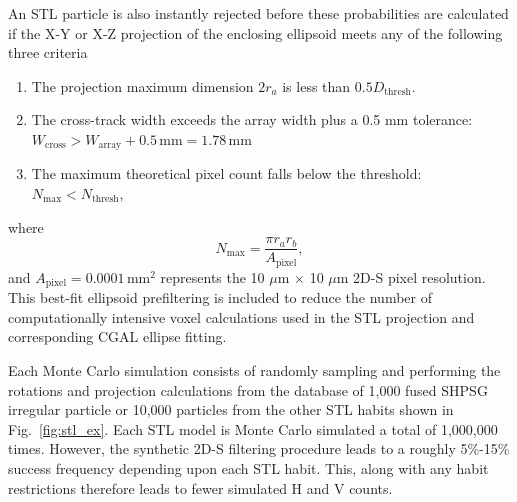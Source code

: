 \documentclass[amt, manuscript]{copernicus}
\begin{document}
An STL particle is also instantly rejected before these probabilities are calculated if the X-Y or X-Z projection of the enclosing ellipsoid meets any of the following three criteria
\begin{enumerate}
\item The projection maximum dimension $2 r_{a}$ is less than $0.5D_{\mathrm{thresh}}$.
\item The cross-track width exceeds the array width plus a 0.5 mm tolerance: $W_{\mathrm{cross}} >W_{\mathrm{array}}+0.5\, \mathrm{mm} = 1.78\, \mathrm{mm}$
\item The maximum theoretical pixel count falls below the threshold: $N_{\mathrm{max}} < N_{\mathrm{thresh}}$,
\end{enumerate} 
where 
\begin{equation}\label{eq:N_max}
N_{\max} = \frac{\pi r_{a} r_{b}}{A_{\mathrm{pixel}}},
\end{equation}
and $A_{\mathrm{pixel}}= 0.0001\, \mathrm{mm}^{2}$ represents the 10 $\mu$m $\times$ 10 $\mu$m 2D-S pixel resolution. This best-fit ellipsoid prefiltering is included to reduce the number of computationally intensive voxel calculations used in the STL projection and corresponding CGAL ellipse fitting.

Each Monte Carlo simulation consists of randomly sampling and performing the rotations and projection calculations from the database of 1,000 fused SHPSG irregular particle or 10,000 particles from the other STL habits shown in Fig.~\ref{fig:stl_ex}. Each STL model is Monte Carlo simulated a total of 1,000,000 times. However, the synthetic 2D-S filtering procedure leads to a roughly 5\%-15\% success frequency depending upon each STL habit. This, along with any \citet{Schima2024} habit restrictions therefore leads to fewer simulated H and V counts.
 








\end{document}

